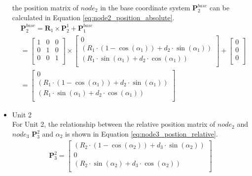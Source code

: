 \begin{itemize}
    the position matrix of $node_{2}$ in the base coordinate system $\textbf{P}_{2}^{base}$ can be calculated in Equation \ref{eq:node2_position_absolute}.
    \begin{align}
        &\textbf{P}_{2}^{base} = \textbf{R}_{1} \times \textbf{P}_{2}^{1} + \textbf{P}_{1}^{base} \nonumber \\
        &=
        \begin{bmatrix}
            1 & 0 & 0 \\
            0 & 1 & 0 \\
            0 & 0 & 1 \\
        \end{bmatrix}
        \times
        \begin{bmatrix}
            0 \\
            (R_1\cdot(1-\cos(\alpha_1)) + d_2\cdot \sin(\alpha_1)) \\
            (R_1\cdot \sin(\alpha_1) + d_2\cdot \cos(\alpha_1)) \\
        \end{bmatrix}
        +
        \begin{bmatrix}
            0 \\
            0 \\
            0 \\
        \end{bmatrix} \nonumber \\
        &=
        \begin{bmatrix}
            0 \\
            (R_1\cdot(1-\cos(\alpha_1)) + d_2\cdot \sin(\alpha_1)) \\
            (R_1\cdot \sin(\alpha_1) + d_2\cdot \cos(\alpha_1)) \\
        \end{bmatrix}
        \label{eq:node2_position_absolute}
    \end{align}
    \item Unit 2 \\
    For Unit 2, the relationship between the relative position matrix of $node_2$ and $node_3$ $\textbf{P}_{3}^{2}$ and 
    $\alpha_2$ is shown in Equation \ref{eq:node3_postion_relative}.
    \begin{align}
        \textbf{P}_{3}^{2} = 
        \begin{bmatrix}
            (R_2\cdot(1-\cos(\alpha_2)) + d_3\cdot \sin(\alpha_2)) \\
            0 \\
            (R_2\cdot \sin(\alpha_2) + d_3\cdot \cos(\alpha_2)) \\

\end{bmatrix}
\end{align}
\end{itemize}
